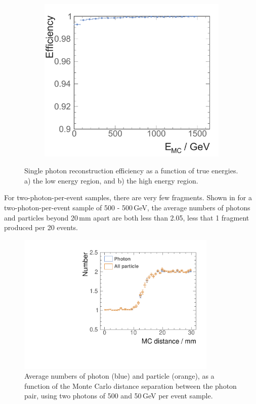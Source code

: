 \begin{figure}[tbph]
\begin{subfigure}[b]{0.45\textwidth}
        \includegraphics[width=\textwidth]{photon/singlePhotonEffEdt}
        \caption{}
        \label{fig:photonSingleEff}
    \end{subfigure}
\caption[Single photon reconstruction efficiency as a function of energy.]
{Single photon reconstruction efficiency as a function of true energies. a) the low energy region, and b) the high energy region.}
\label{fig:photonSingleEffPerformance}
\end{figure}



For  two-photon-per-event samples, there are very few fragments. Shown in  for a two-photon-per-event sample of 500 - 500\,GeV, the average numbers of photons and particles beyond 20\,mm apart are both less than 2.05, less that 1 fragment produced per 20 events.

\begin{figure}[tbph]
\centering
        \includegraphics[width=0.85\textwidth]{photon/DoubleN_pN_all.pdf}
        \caption{Average numbers of photon  (blue) and particle (orange), as a function of the Monte Carlo distance separation between the photon pair, using two photons of 500 and 50\,GeV per event sample. }
        \label{fig:photonDoubleCompareN_pN_all}
\end{figure}

